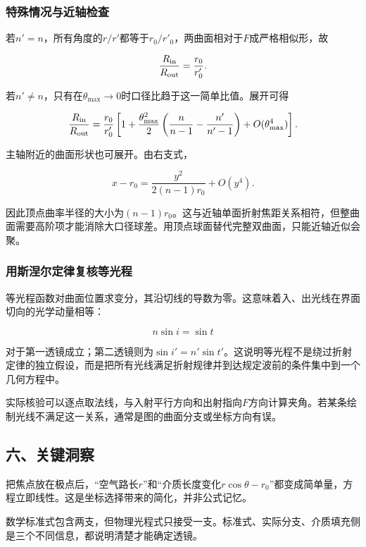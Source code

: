 \documentclass[12pt,a4paper,fontset=fandol]{ctexart}
\begin{document}
\subsubsection{特殊情况与近轴检查}\label{ux7279ux6b8aux60c5ux51b5ux4e0eux8fd1ux8f74ux68c0ux67e5}

若\(n'=n\)，所有角度的\(r/r'\)都等于\(r_0/r'_0\)，两曲面相对于\(F\)成严格相似形，故

\[
\frac{R_{\rm in}}{R_{\rm out}}=\frac{r_0}{r'_0}.
\]

若\(n'\neq n\)，只有在\(\theta_{\max}\to0\)时口径比趋于这一简单比值。展开可得

\[
\frac{R_{\rm in}}{R_{\rm out}}
=\frac{r_0}{r'_0}
\left[1+\frac{\theta_{\max}^2}{2}
\left(\frac n{n-1}-\frac{n'}{n'-1}\right)
+O(\theta_{\max}^4)\right].
\]

主轴附近的曲面形状也可展开。由右支式，

\[
x-r_0=\frac{y^2}{2(n-1)r_0}+O(y^4).
\]

因此顶点曲率半径的大小为\((n-1)r_0\)。这与近轴单面折射焦距关系相符，但整曲面需要高阶项才能消除大口径球差。用顶点球面替代完整双曲面，只能近轴近似会聚。

\subsubsection{用斯涅尔定律复核等光程}\label{ux7528ux65afux6d85ux5c14ux5b9aux5f8bux590dux6838ux7b49ux5149ux7a0b}

等光程函数对曲面位置求变分，其沿切线的导数为零。这意味着入、出光线在界面切向的光学动量相等：

\[
n\sin i=\sin t
\]

对于第一透镜成立；第二透镜则为\(\sin i'=n'\sin t'\)。这说明等光程不是绕过折射定律的独立假设，而是把所有光线满足折射规律并到达规定波前的条件集中到一个几何方程中。

实际核验可以逐点取法线，与入射平行方向和出射指向\(F\)方向计算夹角。若某条绘制光线不满足这一关系，通常是图的曲面分支或坐标方向有误。

\subsection{六、关键洞察}\label{ux516dux5173ux952eux6d1eux5bdf}

把焦点放在极点后，``空气路长\(r\)''和``介质长度变化\(r\cos\theta-r_0\)''都变成简单量，方程立即线性。这是坐标选择带来的简化，并非公式记忆。

数学标准式包含两支，但物理光程式只接受一支。标准式、实际分支、介质填充侧是三个不同信息，都说明清楚才能确定透镜。
\end{document}
